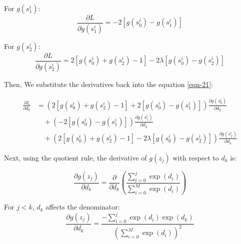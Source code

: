 \documentclass[sigconf]{acmart}
\begin{document}
For $g(s_1^i)$:
\begin{equation}\label{eqn-23} 
\frac{\partial L}{\partial g\left(s_{1}^{i}\right)}=-2\left[g\left(s_{0}^{i}\right)-g\left(s_{1}^{i}\right)\right]
\end{equation}

For $g(s_2^i)$:
\begin{equation}\label{eqn-24} 
\frac{\partial L}{\partial g\left(s_{2}^{i}\right)}=2\left[g\left(s_{0}^{i}\right)+g\left(s_{2}^{i}\right)-1\right]-2 \lambda\left[g\left(s_{0}^{i}\right)-g\left(s_{2}^{i}\right)\right]
\end{equation}

Then, We substitute the derivatives back into the equation \ref{eqn-21}:

\begin{align}\label{eqn-25} 
\frac{\partial L}{\partial d_{k}} & = \left(2\left[g\left(s_{0}^{i}\right)+g\left(s_{2}^{i}\right)-1\right]+2\left[g\left(s_{0}^{i}\right)-g\left(s_{1}^{i}\right)\right]\right) \frac{\partial g\left(s_{0}^{i}\right)}{\partial d_{k}} \nonumber \\
& \quad + \left(-2\left[g\left(s_{0}^{i}\right)-g\left(s_{1}^{i}\right)\right]\right) \frac{\partial g\left(s_{1}^{i}\right)}{\partial d_{k}}  \nonumber \\
& \quad + \left(2\left[g\left(s_{0}^{i}\right)+g\left(s_{2}^{i}\right)-1\right] - 2 \lambda\left[g\left(s_{0}^{i}\right) - g\left(s_{2}^{i}\right)\right]\right) \frac{\partial g\left(s_{2}^{i}\right)}{\partial d_{k}} 
\end{align}


Next, using the quotient rule, the derivative of $g(z_j)$ with respect to 
$d_k$ is:

\begin{equation}\label{eqn-26} 
\frac{\partial g\left(z_{j}\right)}{\partial d_{k}}=\frac{\partial}{\partial d_{k}}\left(\frac{\sum_{i=0}^{j} \exp \left(d_{i}\right)}{\sum_{i=0}^{M} \exp \left(d_{i}\right)}\right)
\end{equation}





For $j<k$,  $d_k$ affects the denominator:
\begin{equation}\label{eqn-25} 
\frac{\partial g\left(z_{j}\right)}{\partial d_{k}}=\frac{-\sum_{i=0}^{j} \exp \left(d_{i}\right) \exp \left(d_{k}\right)}{\left(\sum_{i=0}^{M} \exp \left(d_{i}\right)\right)^{2}}
\end{equation}
\end{document}
